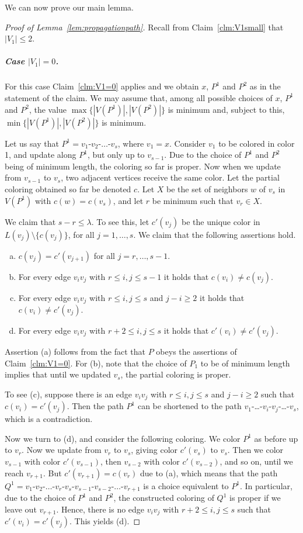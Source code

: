 \documentclass[11pt]{article}
\begin{document}
We can now prove our main lemma.

\begin{proof}[Proof of Lemma~\ref{lem:propagationpath}]
Recall from Claim~\ref{clm:V1small} that $|V_1|\le 2$.


\subparagraph{Case $|V_1|=0$.}
For this case Claim~\ref{clm:V1=0} applies and we obtain $x$, $P^1$ and $P^2$ as in the statement of the claim.
We may assume that, among all possible choices of $x$, $P^1$ and $P^2$, the value $\max\{|V(P^1)|,|V(P^2)|\}$ is minimum and, subject to this, $\min\{|V(P^1)|,|V(P^2)|\}$ is minimum.

Let us say that $P^1=v_1$-$v_2$-$\ldots $-$v_s$, where $v_1=x$.
Consider $v_1$ to be colored in color 1, and update along $P^1$, but only up to $v_{s-1}$.
Due to the choice of $P^1$ and $P^2$ being of minimum length, the coloring so far is proper.
Now when we update from $v_{s-1}$ to $v_s$, two adjacent vertices receive the same color.
Let the partial coloring obtained so far be denoted $c$.
Let $X$ be the set of neighbors $w$ of $v_s$ in $V(P^1)$ with $c(w)=c(v_s)$, and let $r$ be minimum such that $v_r \in X$.

We claim that $s-r\le \lambda$.
To see this, let $c'(v_j)$ be the unique color in $L(v_j)\setminus \{c(v_j)\}$, for all $j=1,\ldots,s$.
We claim that the following assertions hold.
\begin{enumerate}[(a)]
	\item $c(v_j)=c'(v_{j+1})$ for all $j=r,\ldots,s-1$.
	\item For every edge $v_iv_j$ with $r \le i,j\le s-1$ it holds that $c(v_i) \neq c(v_j)$.
	\item For every edge $v_iv_j$ with $r \le i,j\le s$ and $j-i \ge 2$ it holds that $c(v_i) \neq c'(v_j)$.
	\item For every edge $v_iv_j$ with $r+2 \le i,j\le s$ it holds that $c'(v_i) \neq c'(v_j)$.
\end{enumerate}
Assertion (a) follows from the fact that $P$ obeys the assertions of Claim~\ref{clm:V1=0}.
For (b), note that the choice of $P_1$ to be of minimum length implies that until we updated $v_s$, the partial coloring is proper.

To see (c), suppose there is an edge $v_iv_j$ with $r \le i,j\le s$ and $j-i \ge 2$ such that $c(v_i) = c'(v_j)$.
Then the path $P^1$ can be shortened to the path $v_1$-\ldots-$v_i$-$v_j$-\ldots-$v_s$, which is a contradiction.

Now we turn to (d), and consider the following coloring.
We color $P^1$ as before up to $v_r$.
Now we update from $v_r$ to $v_s$, giving color $c'(v_s)$ to $v_s$.
Then we color $v_{s-1}$ with color $c'(v_{s-1})$, then $v_{s-2}$ with color $c'(v_{s-2})$, and so on, until we reach $v_{r+1}$.
But $c'(v_{r+1})=c(v_r)$ due to (a), which means that the path $Q^1=v_1$-$v_2$-$\ldots $-$v_r$-$v_s$-$v_{s-1}$-$v_{s-2}$-$\ldots $-$v_{r+1}$ is a choice equivalent to $P^1$.
In particular, due to the choice of $P^1$ and $P^2$, the constructed coloring of $Q^1$ is proper if we leave out $v_{r+1}$.
Hence, there is no edge $v_iv_j$ with $r+2 \le i,j\le s$ such that $c'(v_i) = c'(v_j)$.
This yields (d).


\end{proof}
\end{document}
